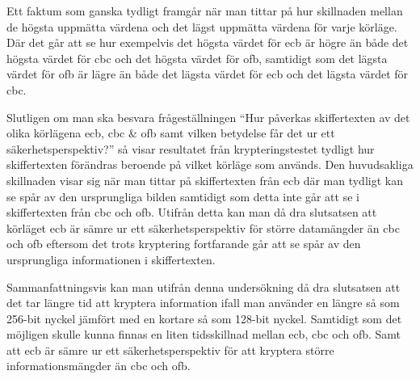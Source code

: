 Ett faktum som ganska tydligt framgår när man tittar på hur skillnaden mellan de högsta uppmätta värdena och det lägst uppmätta värdena för varje körläge. Där det går att se hur
exempelvis det högsta värdet för \acrshort{ecb} är högre än både det högsta värdet för \acrshort{cbc} och det högsta värdet för \acrshort{ofb}, samtidigt som det lägsta värdet för
\acrshort{ofb} är lägre än både det lägsta värdet för \acrshort{ecb} och det lägsta värdet för \acrshort{cbc}.

Slutligen om man ska besvara frågeställningen “Hur påverkas skiffertexten av det olika körlägena \acrshort{ecb}, \acrshort{cbc} \& \acrshort{ofb} samt vilken betydelse får det ur ett säkerhetsperspektiv?”
så visar resultatet från krypteringstestet tydligt hur skiffertexten förändras beroende på vilket körläge som används. Den huvudsakliga skillnaden visar sig när man tittar på skiffertexten
från \acrshort{ecb} där man tydligt kan se spår av den ursprungliga bilden samtidigt som detta inte går att se i skiffertexten från \acrshort{cbc} och \acrshort{ofb}. Utifrån detta kan man då dra slutsatsen
att körläget \acrshort{ecb} är sämre ur ett säkerhetsperspektiv för större datamängder än \acrshort{cbc} och \acrshort{ofb} eftersom det trots kryptering fortfarande går att se spår av den ursprungliga
informationen i skiffertexten.

Sammanfattningsvis kan man utifrån denna undersökning då dra slutsatsen att det tar längre tid att kryptera information ifall man använder en längre så som 256-bit nyckel jämfört med en kortare så som 128-bit nyckel. Samtidigt
som det möjligen skulle kunna finnas en liten tidsskillnad mellan \acrshort{ecb}, \acrshort{cbc} och \acrshort{ofb}. Samt att \acrshort{ecb} är sämre ur ett säkerhetsperspektiv för att kryptera större informationsmängder än
\acrshort{cbc} och \acrshort{ofb}.

